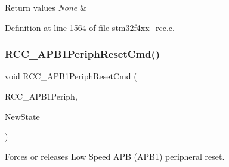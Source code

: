 \begin{DoxyRetVals}{Return values}
{\em None} & \\
\hline
\end{DoxyRetVals}


Definition at line 1564 of file stm32f4xx\+\_\+rcc.\+c.

\mbox{\label{group___r_c_c_gab197ae4369c10b92640a733b40ed2801}} 
\subsubsection{\texorpdfstring{R\+C\+C\+\_\+\+A\+P\+B1\+Periph\+Reset\+Cmd()}{RCC\_APB1PeriphResetCmd()}}
{\footnotesize\ttfamily void R\+C\+C\+\_\+\+A\+P\+B1\+Periph\+Reset\+Cmd (\begin{DoxyParamCaption}\item[{uint32\+\_\+t}]{R\+C\+C\+\_\+\+A\+P\+B1\+Periph,  }\item[{Functional\+State}]{New\+State }\end{DoxyParamCaption})}



Forces or releases Low Speed A\+PB (A\+P\+B1) peripheral reset. 


